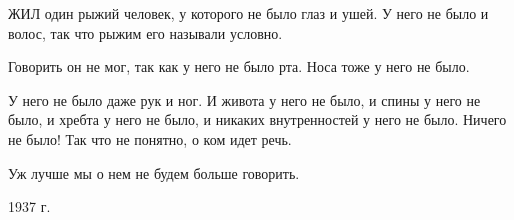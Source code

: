 ЖИЛ  один  рыжий человек,  у которого не было глаз и ушей.  У него не  было  и волос, так что рыжим его называли условно.

Говорить  он  не мог,  так как у него не было рта. Носа тоже у него не было.

У него не было даже рук и ног.  И живота у него  не  было,  и спины у него не было, и хребта у него не было, и никаких внутренностей у него не было.  Ничего не было! Так что не понятно, о ком идет речь.

Уж  лучше мы о нем не будем больше говорить.
\begin{flushright} 1937 г. \end{flushright}